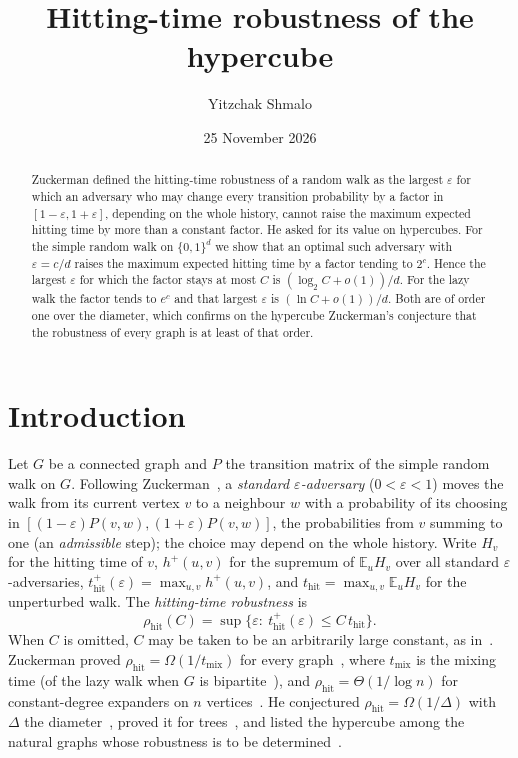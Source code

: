 \documentclass[11pt]{amsart}
\theoremstyle{remark}
\newcommand{\eps}{\varepsilon}
\newcommand{\E}{\mathbb{E}}
\newcommand{\thit}{t_{\mathrm{hit}}}
\newcommand{\rhit}{\rho_{\mathrm{hit}}}
\begin{document}
\title[Hitting-time robustness of the hypercube]{Hitting-time robustness of the hypercube}
\author{Yitzchak Shmalo}
\date{25 November 2026}
\address{Einstein Institute of Mathematics, The Hebrew University of Jerusalem, Jerusalem, Israel}

\begin{abstract}
Zuckerman defined the hitting-time robustness of a random walk as the largest $\eps$ for which an adversary who may
change every transition probability by a factor in $[1-\eps,1+\eps]$, depending on the whole history, cannot raise the
maximum expected hitting time by more than a constant factor. He asked for its value on hypercubes. For the simple
random walk on $\{0,1\}^d$ we show that an optimal such adversary with $\eps=c/d$ raises the maximum expected hitting time by
a factor tending to $2^c$. Hence the largest $\eps$ for which the factor stays at most $C$ is $(\log_2 C+o(1))/d$. For
the lazy walk the factor tends to $e^c$ and that largest $\eps$ is $(\ln C+o(1))/d$. Both are of order one over the
diameter, which confirms on the hypercube Zuckerman's conjecture that the robustness of every graph is at least of that
order.
\end{abstract}

\maketitle

\section{Introduction}\label{sec:intro}

Let $G$ be a connected graph and $P$ the transition matrix of the simple random walk on $G$. Following
Zuckerman~\cite{Zuc26}, a \emph{standard $\eps$-adversary} ($0<\eps<1$) moves the walk from its current vertex $v$ to a
neighbour $w$ with a probability of its choosing in $[(1-\eps)P(v,w),(1+\eps)P(v,w)]$, the probabilities from $v$
summing to one (an \emph{admissible} step); the choice may depend on the whole history. Write $H_v$ for the hitting time of $v$, $h^+(u,v)$ for
the supremum of $\E_u H_v$ over all standard $\eps$-adversaries, $\thit^+(\eps)=\max_{u,v}h^+(u,v)$, and
$\thit=\max_{u,v}\E_uH_v$ for the unperturbed walk. The \emph{hitting-time robustness} is
\[
\rhit(C)=\sup\{\eps:\ \thit^+(\eps)\le C\,\thit\}.
\]
When $C$ is omitted, $C$ may be taken to be an arbitrarily large constant, as in~\cite[Definition~1.9]{Zuc26}.
Zuckerman proved $\rhit=\Omega(1/t_{\mathrm{mix}})$ for every graph~\cite[Theorem~1.10]{Zuc26}, where
$t_{\mathrm{mix}}$ is the mixing time (of the lazy walk when $G$ is bipartite~\cite[Remark~2.9]{Zuc26}), and
$\rhit=\Theta(1/\log n)$ for constant-degree expanders on $n$ vertices~\cite[Theorem~1.12]{Zuc26}. He conjectured $\rhit=\Omega(1/\Delta)$ with $\Delta$ the diameter~\cite[Conjecture~1.16]{Zuc26}, proved it for trees~\cite[Theorem~1.11]{Zuc26}, and listed the hypercube
among the natural graphs whose robustness is to be determined~\cite[Section~1.10]{Zuc26}.
\end{document}
